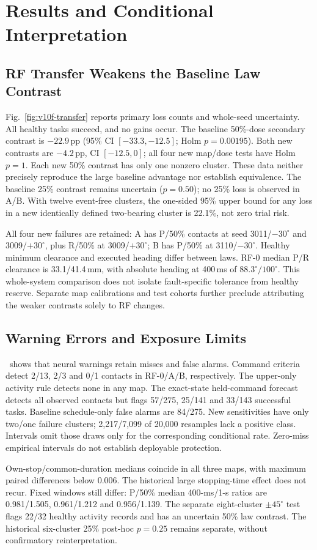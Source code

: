 \section{Results and Conditional Interpretation}
\subsection{RF Transfer Weakens the Baseline Law Contrast}
Fig.~\ref{fig:v10f-transfer} reports primary loss counts and whole-seed uncertainty. All healthy tasks succeed, and no gains occur. The baseline 50\%-dose secondary contrast is $-22.9$\,pp (95\% CI $[-33.3,-12.5]$; Holm $p=0.00195$). Both new contrasts are $-4.2$\,pp, CI $[-12.5,0]$; all four new map/dose tests have Holm $p=1$. Each new 50\% contrast has only one nonzero cluster. These data neither precisely reproduce the large baseline advantage nor establish equivalence. The baseline 25\% contrast remains uncertain ($p=0.50$); no 25\% loss is observed in A/B. With twelve event-free clusters, the one-sided 95\% upper bound for any loss in a new identically defined two-bearing cluster is 22.1\%, not zero trial risk.

All four new failures are retained: A has P/50\% contacts at seed 3011/$-30^\circ$ and 3009/$+30^\circ$, plus R/50\% at 3009/$+30^\circ$; B has P/50\% at 3110/$-30^\circ$. Healthy minimum clearance and executed heading differ between laws. RF-0 median P/R clearance is 33.1/41.4\,mm, with absolute heading at 400\,ms of $88.3^\circ/100^\circ$. This whole-system comparison does not isolate fault-specific tolerance from healthy reserve. Separate map calibrations and test cohorts further preclude attributing the weaker contrasts solely to RF changes.

\subsection{Warning Errors and Exposure Limits}
\WarningFigure
\warningRef\ shows that neural warnings retain misses and false alarms. Command criteria detect 2/13, 2/3 and 0/1 contacts in RF-0/A/B, respectively. The upper-only activity rule detects none in any map. The exact-state held-command forecast detects all observed contacts but flags 57/275, 25/141 and 33/143 successful tasks. Baseline schedule-only false alarms are 84/275. New sensitivities have only two/one failure clusters; 2,217/7,099 of 20,000 resamples lack a positive class. Intervals omit those draws only for the corresponding conditional rate. Zero-miss empirical intervals do not establish deployable protection.

Own-stop/common-duration medians coincide in all three maps, with maximum paired differences below 0.006. The historical large stopping-time effect does not recur. Fixed windows still differ: P/50\% median 400-ms/1-s ratios are 0.981/1.505, 0.961/1.212 and 0.956/1.139. The separate eight-cluster $\pm45^\circ$ test flags 22/32 healthy activity records and has an uncertain 50\% law contrast. The historical six-cluster 25\% post-hoc $p=0.25$ remains separate, without confirmatory reinterpretation.
